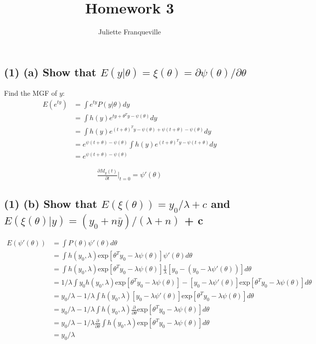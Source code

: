 \documentclass[11pt]{article}
\begin{document}
 
\title{Homework 3}
\author{Juliette Franqueville\\
}
\maketitle

\subsection*{(1) (a) Show that $E(y | \theta) = 
\xi(\theta)= \partial \psi(\theta) / \partial \theta$}

Find the MGF of $y$:
\begin{align*}
    E(e^{ty}) &= \int e^{ty}P(y|\theta)dy\\
    &=  \int h(y)e^{ty+\theta^Ty-\psi(\theta)}dy\\
     &=  \int h(y)e^{(t+\theta)^Ty -\psi(\theta) + \psi(t+\theta) -\psi(\theta)}dy\\
     &=  e^{\psi(t+\theta) -\psi(\theta)}\int h(y)e^{(t+\theta)^Ty -\psi(t+\theta)}dy\\
     &= e^{\psi(t+\theta) -\psi(\theta)}
\end{align*}

\begin{align*}
   \frac{\partial M_y(t)}{\partial t}\rvert_{t=0} = \psi'(\theta)
\end{align*}

\subsection*{(1) (b) Show that $E(\xi(\theta)) = y_0 / \lambda + c$
and $E(\xi(\theta)|y) = (y_0 + n\bar{y})/(\lambda + n)$ + c}

\begin{align*}
    E(\psi'(\theta)) &= \int P(\theta)\psi'(\theta)d\theta\\
    &= \int h(y_0, \lambda)\text{exp}[\theta^Ty_0-\lambda \psi(\theta)]\psi'(\theta)d\theta\\
     &= \int h(y_0, \lambda)\text{exp}[\theta^Ty_0-\lambda \psi(\theta)]\frac{1}{\lambda}[y_0 - (y_0-\lambda\psi'(\theta))]d\theta\\
     &= 1/\lambda \int y_0 h(y_0, \lambda)\text{exp}[\theta^Ty_0-\lambda \psi(\theta)] - [y_0-\lambda\psi'(\theta)]\text{exp}[\theta^Ty_0-\lambda  \psi(\theta)] d\theta\\
     &= y_0/\lambda - 1/\lambda \int  h(y_0, \lambda) [y_0-\lambda\psi'(\theta)]\text{exp}[\theta^Ty_0-\lambda  \psi(\theta)] d\theta\\
     &= y_0/\lambda - 1/\lambda \int  h(y_0, \lambda) \frac{\partial}{\partial \theta}\text{exp}[\theta^Ty_0-\lambda  \psi(\theta)] d\theta\\
      &= y_0/\lambda - 1/\lambda \frac{\partial}{\partial \theta} \int  h(y_0, \lambda) \text{exp}[\theta^Ty_0-\lambda  \psi(\theta)] d\theta\\
      &= y_0/\lambda 
\end{align*}
\end{document}
